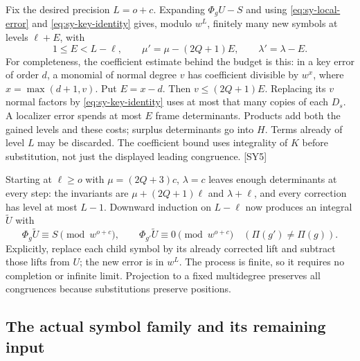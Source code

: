 Fix the desired precision $L=o+c$. Expanding $\Phi_gU-S$ and using \eqref{eq:sy-local-error} and \eqref{eq:sy-key-identity} gives, modulo $w^L$, finitely many new symbols at levels $\ell+E$, with
\begin{equation}\label{eq:sy-spares}
1\le E<L-\ell,\qquad
\mu'=\mu-(2Q+1)E,\qquad \lambda'=\lambda-E.
\end{equation}
For completeness, the coefficient estimate behind the budget is this: in a key error of order $d$, a monomial of normal degree $v$ has coefficient divisible by $w^x$, where $x=\max(d+1,v)$. Put $E=x-d$. Then $v\le(2Q+1)E$. Replacing its $v$ normal factors by \eqref{eq:sy-key-identity} uses at most that many copies of each $D_s$. A localizer error spends at most $E$ frame determinants. Products add both the gained levels and these costs; surplus determinants go into $H$. Terms already of level $L$ may be discarded. The coefficient bound uses integrality of $K$ before substitution, not just the displayed leading congruence. \textsf{[SY5]}

Starting at $\ell\ge o$ with $\mu=(2Q+3)c$, $\lambda=c$ leaves enough determinants at every step: the invariants are $\mu+(2Q+1)\ell$ and $\lambda+\ell$, and every correction has level at most $L-1$. Downward induction on $L-\ell$ now produces an integral $\widetilde U$ with
\[
\Phi_g\widetilde U\equiv S\pmod {w^{o+c}},\qquad
\Phi_{g'}\widetilde U\equiv0\pmod {w^{o+c}}\quad(\Pi(g')\ne\Pi(g)).
\]
Explicitly, replace each child symbol by its already corrected lift and subtract those lifts from $U$; the new error is in $w^L$. The process is finite, so it requires no completion or infinite limit. Projection to a fixed multidegree preserves all congruences because substitutions preserve positions.

\subsection{The actual symbol family and its remaining input}

